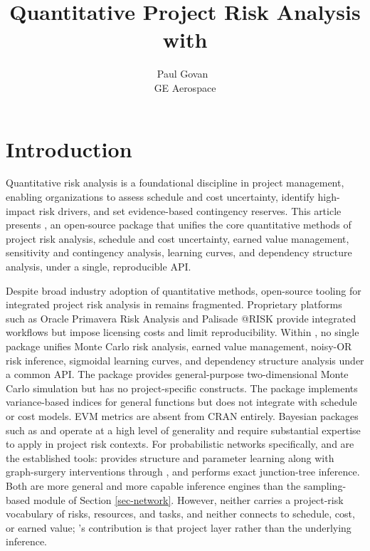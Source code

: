 \documentclass[
]{jss}
\author{
Paul Govan~\orcidlink{0000-0002-1821-8492}\\GE Aerospace
}
\title{Quantitative Project Risk Analysis with \pkg{PRA}}
\begin{document}
\section{Introduction}\label{introduction}

Quantitative risk analysis is a foundational discipline in project
management, enabling organizations to assess schedule and cost
uncertainty, identify high-impact risk drivers, and set evidence-based
contingency reserves. This article presents , an open-source
 package that unifies the core quantitative methods of
project risk analysis, schedule and cost uncertainty, earned value
management, sensitivity and contingency analysis, learning curves, and
dependency structure analysis, under a single, reproducible API.

Despite broad industry adoption of quantitative methods, open-source
tooling for integrated project risk analysis in  remains
fragmented. Proprietary platforms such as Oracle Primavera Risk Analysis
and Palisade @RISK provide integrated workflows but impose licensing
costs and limit reproducibility. Within , no single package
unifies Monte Carlo risk analysis, earned value management, noisy-OR
risk inference, sigmoidal learning curves, and dependency structure
analysis under a common API. The  package \citep{mc2d}
provides general-purpose two-dimensional Monte Carlo simulation but has
no project-specific constructs. The  package
\citep{sensitivity} implements variance-based indices for general
functions but does not integrate with schedule or cost models. EVM
metrics are absent from CRAN entirely. Bayesian packages such as
 \citep{rstan} and  \citep{brms} operate at a high
level of generality and require substantial expertise to apply in
project risk contexts. For probabilistic networks specifically,
 \citep{bnlearn} and  \citep{gRain} are the
established  tools:  provides structure and
parameter learning along with graph-surgery interventions through
, and  performs exact junction-tree
inference. Both are more general and more capable inference engines than
the sampling-based module of Section \ref{sec-network}. However, neither
carries a project-risk vocabulary of risks, resources, and tasks, and
neither connects to schedule, cost, or earned value; 's
contribution is that project layer rather than the underlying inference.
\end{document}
